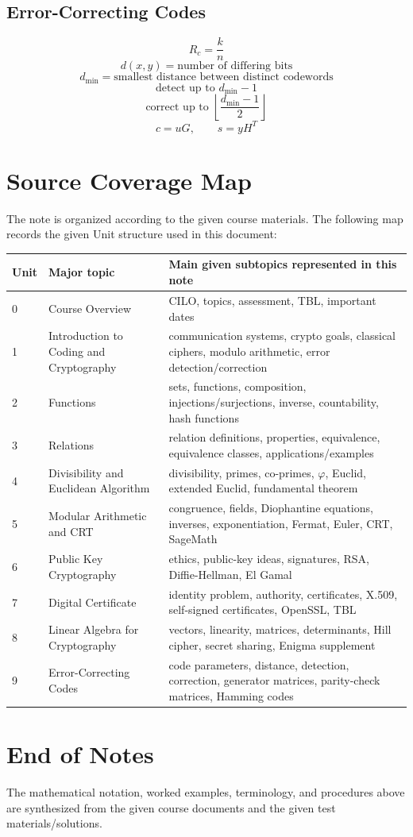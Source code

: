 \documentclass[12pt]{article}
\begin{document}
\subsection{Error-Correcting Codes}
\[
R_c=\frac{k}{n}
\]
\[
d(x,y)=\text{number of differing bits}
\]
\[
d_{\min}=\text{smallest distance between distinct codewords}
\]
\[
\text{detect up to }d_{\min}-1
\]
\[
\text{correct up to }\left\lfloor\frac{d_{\min}-1}{2}\right\rfloor
\]
\[
c=uG,
\qquad
s=yH^T
\]

\newpage
\section{Source Coverage Map}
The note is organized according to the given course materials. The following map records the given Unit structure used in this document:
\begin{table}[H]
\centering
\small
\begin{tabularx}{\textwidth}{l l X}
\toprule
Unit & Major topic & Main given subtopics represented in this note\\
\midrule
0 & Course Overview & CILO, topics, assessment, TBL, important dates\\
1 & Introduction to Coding and Cryptography & communication systems, crypto goals, classical ciphers, modulo arithmetic, error detection/correction\\
2 & Functions & sets, functions, composition, injections/surjections, inverse, countability, hash functions\\
3 & Relations & relation definitions, properties, equivalence, equivalence classes, applications/examples\\
4 & Divisibility and Euclidean Algorithm & divisibility, primes, co-primes, $\varphi$, Euclid, extended Euclid, fundamental theorem\\
5 & Modular Arithmetic and CRT & congruence, fields, Diophantine equations, inverses, exponentiation, Fermat, Euler, CRT, SageMath\\
6 & Public Key Cryptography & ethics, public-key ideas, signatures, RSA, Diffie-Hellman, El Gamal\\
7 & Digital Certificate & identity problem, authority, certificates, X.509, self-signed certificates, OpenSSL, TBL\\
8 & Linear Algebra for Cryptography & vectors, linearity, matrices, determinants, Hill cipher, secret sharing, Enigma supplement\\
9 & Error-Correcting Codes & code parameters, distance, detection, correction, generator matrices, parity-check matrices, Hamming codes\\
\bottomrule
\end{tabularx}
\end{table}

\newpage
\section*{End of Notes}
\noindent The mathematical notation, worked examples, terminology, and procedures above are synthesized from the given course documents and the given test materials/solutions.\
\end{document}
